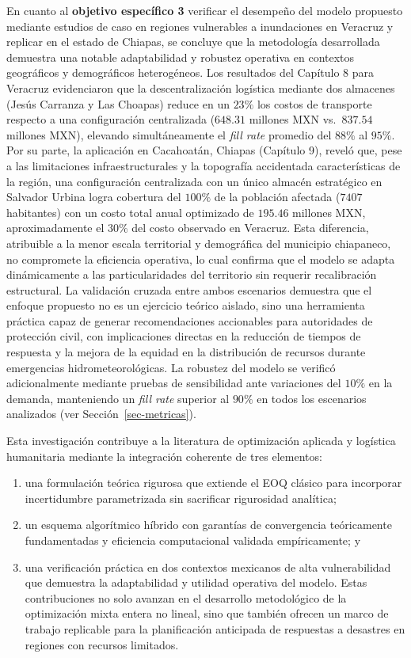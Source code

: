 \documentclass[
  spanish,
  us-letterpaper,
]{scrreprt}
\numberwithin{equation}{section}
\begin{document}
En cuanto al \textbf{objetivo específico 3} verificar el desempeño del
modelo propuesto mediante estudios de caso en regiones vulnerables a
inundaciones en Veracruz y replicar en el estado de Chiapas, se concluye
que la metodología desarrollada demuestra una notable adaptabilidad y
robustez operativa en contextos geográficos y demográficos heterogéneos.
Los resultados del Capítulo 8 para Veracruz evidenciaron que la
descentralización logística mediante dos almacenes (Jesús Carranza y Las
Choapas) reduce en un \(23\%\) los costos de transporte respecto a una
configuración centralizada (\(648.31\) millones MXN vs.~\(837.54\)
millones MXN), elevando simultáneamente el \emph{fill rate} promedio del
\(88\%\) al \(95\%\). Por su parte, la aplicación en Cacahoatán, Chiapas
(Capítulo 9), reveló que, pese a las limitaciones infraestructurales y
la topografía accidentada características de la región, una
configuración centralizada con un único almacén estratégico en Salvador
Urbina logra cobertura del \(100\%\) de la población afectada (\(7407\)
habitantes) con un costo total anual optimizado de \(195.46\) millones
MXN, aproximadamente el \(30\%\) del costo observado en Veracruz. Esta
diferencia, atribuible a la menor escala territorial y demográfica del
municipio chiapaneco, no compromete la eficiencia operativa, lo cual
confirma que el modelo se adapta dinámicamente a las particularidades
del territorio sin requerir recalibración estructural. La validación
cruzada entre ambos escenarios demuestra que el enfoque propuesto no es
un ejercicio teórico aislado, sino una herramienta práctica capaz de
generar recomendaciones accionables para autoridades de protección
civil, con implicaciones directas en la reducción de tiempos de
respuesta y la mejora de la equidad en la distribución de recursos
durante emergencias hidrometeorológicas. La robustez del modelo se
verificó adicionalmente mediante pruebas de sensibilidad ante
variaciones del \(10\%\) en la demanda, manteniendo un \emph{fill rate}
superior al \(90\%\) en todos los escenarios analizados (ver
Sección~\ref{sec-metricas}).

Esta investigación contribuye a la literatura de optimización aplicada y
logística humanitaria mediante la integración coherente de tres
elementos:

\begin{enumerate}
\def\labelenumi{\arabic{enumi}.}
\item
  una formulación teórica rigurosa que extiende el EOQ clásico para
  incorporar incertidumbre parametrizada sin sacrificar rigurosidad
  analítica;
\item
  un esquema algorítmico híbrido con garantías de convergencia
  teóricamente fundamentadas y eficiencia computacional validada
  empíricamente; y
\item
  una verificación práctica en dos contextos mexicanos de alta
  vulnerabilidad que demuestra la adaptabilidad y utilidad operativa del
  modelo. Estas contribuciones no solo avanzan en el desarrollo
  metodológico de la optimización mixta entera no lineal, sino que
  también ofrecen un marco de trabajo replicable para la planificación
  anticipada de respuestas a desastres en regiones con recursos
  limitados.
\end{enumerate}
\end{document}
